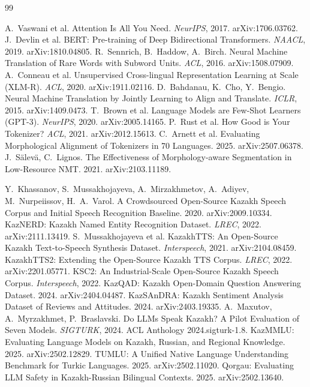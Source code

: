 \documentclass{article}
\begin{document}
\begin{thebibliography}{99}

 A.~Vaswani et al. Attention Is All You Need. \emph{NeurIPS}, 2017. arXiv:1706.03762.
 J.~Devlin et al. BERT: Pre-training of Deep Bidirectional Transformers. \emph{NAACL}, 2019. arXiv:1810.04805.
 R.~Sennrich, B.~Haddow, A.~Birch. Neural Machine Translation of Rare Words with Subword Units. \emph{ACL}, 2016. arXiv:1508.07909.
 A.~Conneau et al. Unsupervised Cross-lingual Representation Learning at Scale (XLM-R). \emph{ACL}, 2020. arXiv:1911.02116.
 D.~Bahdanau, K.~Cho, Y.~Bengio. Neural Machine Translation by Jointly Learning to Align and Translate. \emph{ICLR}, 2015. arXiv:1409.0473.
 T.~Brown et al. Language Models are Few-Shot Learners (GPT-3). \emph{NeurIPS}, 2020. arXiv:2005.14165.
 P.~Rust et al. How Good is Your Tokenizer? \emph{ACL}, 2021. arXiv:2012.15613.
 C.~Arnett et al. Evaluating Morphological Alignment of Tokenizers in 70 Languages. 2025. arXiv:2507.06378.
 J.~S\"alev\"a, C.~Lignos. The Effectiveness of Morphology-aware Segmentation in Low-Resource NMT. 2021. arXiv:2103.11189.

 Y.~Khassanov, S.~Mussakhojayeva, A.~Mirzakhmetov, A.~Adiyev, M.~Nurpeiissov, H.~A.~Varol. A Crowdsourced Open-Source Kazakh Speech Corpus and Initial Speech Recognition Baseline. 2020. arXiv:2009.10334.
 KazNERD: Kazakh Named Entity Recognition Dataset. \emph{LREC}, 2022. arXiv:2111.13419.
 S.~Mussakhojayeva et al. KazakhTTS: An Open-Source Kazakh Text-to-Speech Synthesis Dataset. \emph{Interspeech}, 2021. arXiv:2104.08459.
 KazakhTTS2: Extending the Open-Source Kazakh TTS Corpus. \emph{LREC}, 2022. arXiv:2201.05771.
 KSC2: An Industrial-Scale Open-Source Kazakh Speech Corpus. \emph{Interspeech}, 2022.
 KazQAD: Kazakh Open-Domain Question Answering Dataset. 2024. arXiv:2404.04487.
 KazSAnDRA: Kazakh Sentiment Analysis Dataset of Reviews and Attitudes. 2024. arXiv:2403.19335.
 A.~Maxutov, A.~Myrzakhmet, P.~Braslavski. Do LLMs Speak Kazakh? A Pilot Evaluation of Seven Models. \emph{SIGTURK}, 2024. ACL Anthology 2024.sigturk-1.8.
 KazMMLU: Evaluating Language Models on Kazakh, Russian, and Regional Knowledge. 2025. arXiv:2502.12829.
 TUMLU: A Unified Native Language Understanding Benchmark for Turkic Languages. 2025. arXiv:2502.11020.
 Qorgau: Evaluating LLM Safety in Kazakh-Russian Bilingual Contexts. 2025. arXiv:2502.13640.


\end{thebibliography}
\end{document}

